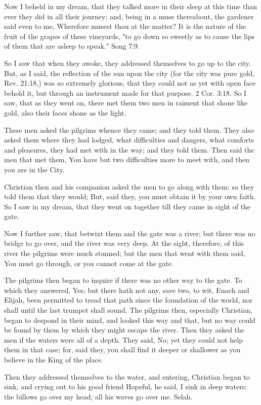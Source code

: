 Now I beheld in my dream, that they talked more in their sleep at this
time than ever they did in all their journey; and, being in a muse
thereabout, the gardener said even to me, Wherefore musest thou at the
matter? It is the nature of the fruit of the grapes of these vineyards,
"to go down so sweetly as to cause the lips of them that are asleep to
speak." Song 7:9.

So I saw that when they awoke, they addressed themselves to go up to
the city. But, as I said, the reflection of the sun upon the city (for
the city was pure gold, Rev. 21:18,) was so extremely glorious, that
they could not as yet with open face behold it, but through an
instrument made for that purpose. 2 Cor. 3:18. So I saw, that as they
went on, there met them two men in raiment that shone like gold, also
their faces shone as the light.

These men asked the pilgrims whence they came; and they told them. They
also asked them where they had lodged, what difficulties and dangers,
what comforts and pleasures, they had met with in the way; and they
told them. Then said the men that met them, You have but two
difficulties more to meet with, and then you are in the City.

Christian then and his companion asked the men to go along with them:
so they told them that they would; But, said they, you must obtain it
by your own faith. So I saw in my dream, that they went on together
till they came in sight of the gate.

Now I further saw, that betwixt them and the gate was a river; but
there was no bridge to go over, and the river was very deep. At the
sight, therefore, of this river the pilgrims were much stunned; but the
men that went with them said, You must go through, or you cannot come
at the gate.

The pilgrims then began to inquire if there was no other way to the
gate. To which they answered, Yes; but there hath not any, save two, to
wit, Enoch and Elijah, been permitted to tread that path since the
foundation of the world, nor shall until the last trumpet shall sound.
The pilgrims then, especially Christian, began to despond in their
mind, and looked this way and that, but no way could be found by them
by which they might escape the river. Then they asked the men if the
waters were all of a depth. They said, No; yet they could not help them
in that case; for, said they, you shall find it deeper or shallower as
you believe in the King of the place.

Then they addressed themselves to the water, and entering, Christian
began to sink, and crying out to his good friend Hopeful, he said, I
sink in deep waters; the billows go over my head; all his waves go over
me. Selah.

